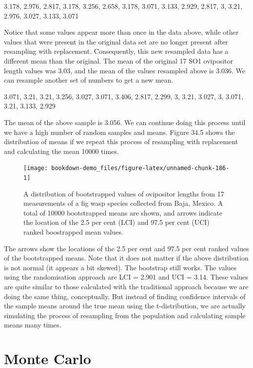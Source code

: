 \documentclass[
]{scrbook}
\begin{document}
3.178, 2.976, 2.817, 3.178, 3.256, 2.658, 3.178, 3.071, 3.133, 2.929, 2.817, 3, 3.21, 2.976, 3.027, 3.133, 3.071

Notice that some values appear more than once in the data above, while other values that were present in the original data set are no longer present after resampling with replacement. Consequently, this new resampled data has a different mean than the original.
The mean of the original 17 SO1 ovipositor length values was 3.03, and the mean of the values resampled above is 3.036.
We can resample another set of numbers to get a new mean.

3.071, 3.21, 3.21, 3.256, 3.027, 3.071, 3.406, 2.817, 2.299, 3, 3.21, 3.027, 3, 3.071, 3.21, 3.133, 2.929

The mean of the above sample is 3.056.
We can continue doing this process until we have a high number of random samples and means. Figure 34.5 shows the distribution of means if we repeat this process of resampling with replacement and calculating the mean 10000 times.

\begin{figure}
\texttt{[image: bookdown-demo\_files/figure-latex/unnamed-chunk-186-1]} \caption{A distribution of bootstrapped values of ovipositor lengths from 17 measurements of a fig wasp species collected from Baja, Mexico. A total of 10000 bootstrapped means are shown, and arrows indicate the location of the 2.5 per cent (LCI) and 97.5 per cent (UCI) ranked boostrapped mean values.}\label{fig:unnamed-chunk-186}
\end{figure}

The arrows show the locations of the 2.5 per cent and 97.5 per cent ranked values of the bootstrapped means.
Note that it does not matter if the above distribution is not normal (it appears a bit skewed).
The bootstrap still works.
The values using the randomisation approach are LCI = 2.901 and UCI = 3.14.
These values are quite similar to those calculated with the traditional approach because we are doing the same thing, conceptually.
But instead of finding confidence intervals of the sample means around the true mean using the t-distribution, we are actually simulating the process of resampling from the population and calculating sample means many times.

\hypertarget{monte-carlo}{%
\section{Monte Carlo}\label{monte-carlo}}
\end{document}
